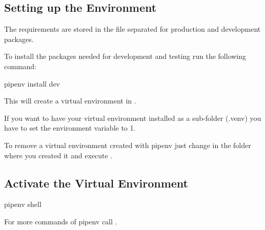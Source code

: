 \documentclass[a4paper,10pt, twoside,english]{sphinxmanual}
\begin{document}
\subsection{Setting up the Environment}
\label{\detokenize{setup_development_testing:setting-up-the-environment}}
The requirements are stored in the file  separated for production and development packages.

To install the packages needed for development and testing run the following command:

\begin{sphinxVerbatim}[commandchars=\\\{\}]
\PYGZdl{} pipenv install \PYGZhy{}\PYGZhy{}dev
\end{sphinxVerbatim}

This will create a virtual environment in .

If you want to have your virtual environment installed as a sub-folder (.venv) you have to set the
environment variable  to 1.

To remove a virtual environment created with pipenv just change in the folder where you created it
and execute .


\subsection{Activate the Virtual Environment}
\label{\detokenize{setup_development_testing:activate-the-virtual-environment}}
\def\sphinxLiteralBlockLabel{\label{\detokenize{setup_development_testing:id10}}}
\begin{sphinxVerbatim}[commandchars=\\\{\}]
\PYGZdl{} pipenv shell
\end{sphinxVerbatim}
\def\sphinxLiteralBlockLabel{\label{\detokenize{setup_development_testing:id11}}}
\begin{sphinxVerbatim}[commandchars=\\\{\}]
\PYGZdl{} 
\end{sphinxVerbatim}

For more commands of pipenv call .
\end{document}
